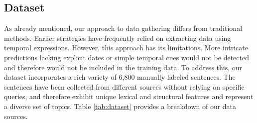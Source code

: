 \documentclass[sigconf]{acmart}
\begin{document}
\subsection{Dataset}
As already mentioned, our approach to data gathering differs from traditional methods. Earlier strategies have frequently relied on extracting data using temporal expressions. However, this approach has its limitations. More intricate predictions lacking explicit dates or simple temporal cues would not be detected and therefore would not be included in the training data.
To address this, our dataset incorporates a rich variety of 6,800 manually labeled sentences. 
The sentences have been collected from different sources without relying on specific queries, and therefore exhibit unique lexical and structural features and represent a diverse set of topics. 
Table \ref{tab:dataset} provides a breakdown of our data sources.

\vspace*{-0.6cm}

\begin{table}[h]
  \caption{Data source analysis: count of Future-Related (Positive) vs. Non-Future-Related (Negative) sentences, along with rate of sentences lacking temporal expressions.}
    \vspace*{-0.4cm}
  \label{tab:dataset}
\end{table}


\vspace*{-0.6cm}
\end{document}
